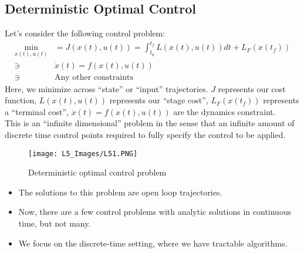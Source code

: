 \subsection{Deterministic Optimal Control}
Let's consider the following control problem:
\begin{align}
    \min_{x(t), u(t)} &= J(x(t), u(t)) = \int_{t_0}^{t_f} L(x(t), u(t)) dt + L_{F} (x(t_f)) \\
    \ni \ &\dot{x}(t) = f(x(t), u(t)) \\
    \ni \ &\textrm{Any other constraints} 
\end{align}
Here, we minimize across ``state'' or ``input'' trajectories. $J$ represents our cost function, $L(x(t), u(t))$ represents our ``stage cost'', $L_{F} (x(t_f))$ represents a ``terminal cost'', $\dot{x}(t) = f(x(t), u(t))$ are the dynamics constraint. \\

\noindent
This is an ``infinite dimensional'' problem in the sense that an infinite amount of discrete time control points required to fully specify the control to be applied. 
\begin{figure}[h!]
    \centering
    \texttt{[image: L5\_Images/L51.PNG]}
    \caption{Deterministic optimal control problem}
    \label{fig:l5f1}
\end{figure}
\begin{itemize}
    \item The solutions to this problem are open loop trajectories. 
    \item Now, there are a few control problems with analytic solutions in continuous time, but not many. 
    \item We focus on the discrete-time setting, where we have tractable algorithms.
\end{itemize}

